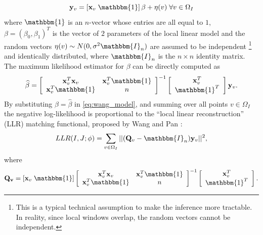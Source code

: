 \begin{equation}\label{eq:wang_model}
    \mathbf{y}_{v} = \left[\mathbf{x}_{v} \; \mathbbm{1}\right]\beta + \eta(v) \; \forall v\in\Omega_{I}
\end{equation}
where $\mathbbm{1}$ is an $n$-vector whose entries are all equal to $1$,  $\beta = (\beta_{0}, \beta_{1})^{T}$ is the vector of $2$ parameters of the local linear model and the random vectors $\eta(v)\sim N(0, \sigma^{2} \mathbbm{I}_{n})$ are assumed to be independent \footnote{This is a typical technical assumption to make the inference more tractable. In reality, since local windows overlap, the random vectors cannot be independent.} and identically distributed, where $\mathbbm{I}_{n}$ is the $n \times n$ identity matrix. The maximum likelihood estimator for $\beta$ can be directly computed as
\begin{equation}\label{eq:wang_model_mle_beta}
    \widehat{\beta} =
    \left[\begin{array}{cc}
        \mathbf{x}_{v}^{T}\mathbf{x}_{v} & \mathbf{x}_{v}^{T}\mathbbm{1}\\
        \mathbf{x}_{v}^{T}\mathbbm{1} & n
    \end{array}\right]^{-1}
    \left[\begin{array}{c}
        \mathbf{x}_{v}^{T}\\
        \mathbbm{1}^{T}
    \end{array}\right]\mathbf{y}_{v}.
\end{equation}
By substituting $\beta = \widehat{\beta}$ in \eqref{eq:wang_model}, and summing over all points $v\in\Omega_{I}$ the negative log-likelihood is proportional to the ``local linear reconstruction'' (LLR) matching functional, proposed by Wang and Pan \cite{Wang2014}:
\begin{equation}\label{eq:wang_metric}
    LLR(I, J;\phi) = \sum_{v\in\Omega_{I}}|| (\mathbf{Q}_{v} - \mathbbm{I}_{n})\mathbf{y}_{v}||^{2},
\end{equation}
where
\begin{equation}\label{eq:def_P_v}
    \mathbf{Q_v} = [\mathbf{x}_{v} \; \mathbbm{1}]
    \left[\begin{array}{cc}
        \mathbf{x}_{v}^{T}\mathbf{x}_{v} & \mathbf{x}_{v}^{T}\mathbbm{1}\\
        \mathbf{x}_{v}^{T}\mathbbm{1} & n
    \end{array}\right]^{-1}
    \left[\begin{array}{c}
        \mathbf{x}_{v}^{T}\\
        \mathbbm{1}^{T}
    \end{array}\right].
\end{equation}
